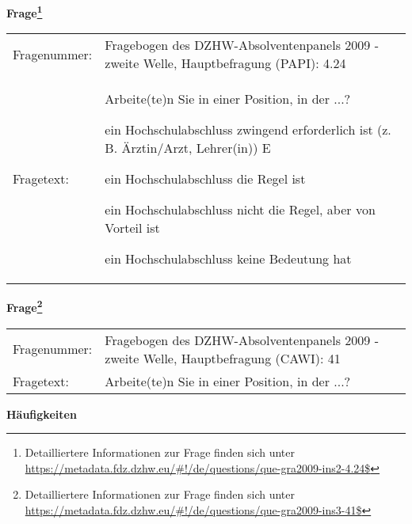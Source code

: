 				\vspace*{0.5cm}
                \noindent\textbf{Frage\footnote{Detailliertere Informationen zur Frage finden sich unter
		              \url{https://metadata.fdz.dzhw.eu/\#!/de/questions/que-gra2009-ins2-4.24$}}}\\
				\begin{tabularx}{\hsize}{@{}lX}
					Fragenummer: &
					  Fragebogen des DZHW-Absolventenpanels 2009 - zweite Welle, Hauptbefragung (PAPI):
					  4.24
 \\
					Fragetext: & Arbeite(te)n Sie in einer Position, in der ...?\par  ein Hochschulabschluss zwingend erforderlich ist (z. B. Ärztin/Arzt, Lehrer(in)) E\par  ein Hochschulabschluss die Regel ist\par  ein Hochschulabschluss nicht die Regel, aber von Vorteil ist\par  ein Hochschulabschluss keine Bedeutung hat \\
				\end{tabularx}
				\vspace*{0.5cm}
                \noindent\textbf{Frage\footnote{Detailliertere Informationen zur Frage finden sich unter
		              \url{https://metadata.fdz.dzhw.eu/\#!/de/questions/que-gra2009-ins3-41$}}}\\
				\begin{tabularx}{\hsize}{@{}lX}
					Fragenummer: &
					  Fragebogen des DZHW-Absolventenpanels 2009 - zweite Welle, Hauptbefragung (CAWI):
					  41
 \\
					Fragetext: & Arbeite(te)n Sie in einer Position, in der ...? \\
				\end{tabularx}





        		\vspace*{0.5cm}
                \noindent\textbf{Häufigkeiten}

